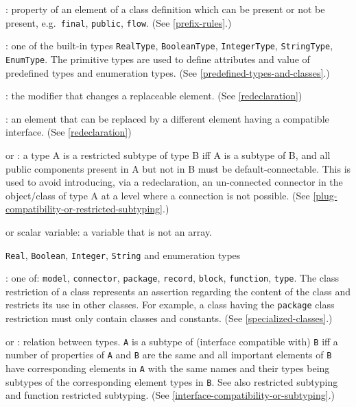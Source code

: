 : property of an element of a class definition which can
be present or not be present, e.g.\ \lstinline!final!, \lstinline!public!, \lstinline!flow!. (See \cref{prefix-rules}.)

: one of the built-in types \lstinline!RealType!,
\lstinline!BooleanType!, \lstinline!IntegerType!, \lstinline!StringType!, \lstinline!EnumType!. The primitive types are
used to define attributes and value of predefined types and enumeration
types. (See \cref{predefined-types-and-classes}.)

: the modifier that changes a replaceable element.
(See \cref{redeclaration})

: an element that can be replaced by a different
element having a compatible interface. (See \cref{redeclaration})

 or : a type A
is a restricted subtype of type B iff A is a subtype of B, and all
public components present in A but not in B must be default-connectable.
This is used to avoid introducing, via a redeclaration, an un-connected
connector in the object/class of type A at a level where a connection is
not possible. (See \cref{plug-compatibility-or-restricted-subtyping}.)

 or scalar variable: a variable that is not an array.

 \lstinline!Real!, \lstinline!Boolean!, \lstinline!Integer!, \lstinline!String! and enumeration types

: one of: \lstinline!model!, \lstinline!connector!, \lstinline!package!, \lstinline!record!, \lstinline!block!, \lstinline!function!, \lstinline!type!.  The class restriction of a class represents an assertion regarding the content of the class and restricts its use in other classes.  For example, a class having the \lstinline!package! class restriction must only contain classes and constants.  (See \cref{specialized-classes}.)

 or : relation between types.  \lstinline!A! is a subtype of (interface compatible with) \lstinline!B! iff a number of properties of \lstinline!A! and \lstinline!B! are the same and all important elements of \lstinline!B! have corresponding elements in \lstinline!A! with the same names and their types being subtypes of the corresponding element types in \lstinline!B!. See also restricted subtyping and function restricted subtyping. (See \cref{interface-compatibility-or-subtyping}.)

